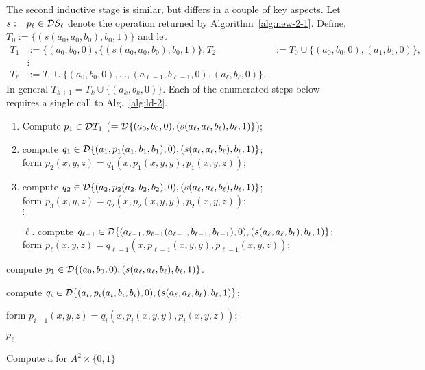   The second inductive stage is similar, but differs in a couple of key aspects.
Let $s := p_\ell \in \mathcal{D} S_\ell$ denote the operation returned by Algorithm~\ref{alg:new-2-1}.
Define, $T_0 := \{(s(a_{0}, a_{0}, b_{0}), b_{0}, 1)\}$ and let
\begin{align*}
  T_1 &:= \{(a_0, b_0, 0), \{(s(a_{0}, a_{0}, b_{0}), b_{0}, 1)\},
  T_2 &:=  T_0 \cup\{(a_0, b_0, 0), (a_1, b_1, 0)\},\\
  & \vdots\\
  T_\ell &:= T_0 \cup \{(a_0, b_0, 0), \dots,
(a_{\ell-1}, b_{\ell-1},0), (a_{\ell}, b_{\ell},0)\}.
\end{align*}
In general $T_{k+1} = T_{k} \cup \{(a_k, b_k, 0)\}$.
Each of the enumerated steps below requires a single call to Alg.~\ref{alg:ld-2}.
\begin{enumerate}[1.]
  \item Compute $p_1 \in \mathcal{D} T_1$ ($ = \mathcal{D} \{(a_0, b_0, 0), (s(a_{\ell}, a_{\ell}, b_{\ell}), b_{\ell}, 1)\}$);
  \item compute $q_1\in \mathcal{D} \{(a_1, p_1(a_1, b_1, b_1), 0), (s(a_{\ell}, a_{\ell}, b_{\ell}), b_{\ell}, 1)\}$; \\
  form $p_2(x,y,z) = q_1(x, p_1(x,y,y), p_1(x,y,z))$;
  \item compute $q_2\in \mathcal{D} \{(a_2, p_2(a_2, b_2, b_2), 0), (s(a_{\ell}, a_{\ell}, b_{\ell}), b_{\ell}, 1)\}$; \\
  form $p_3(x,y,z) = q_2(x, p_2(x,y,y), p_2(x,y,z))$;\\
  $\vdots$
  \item[$\ell$.] compute $q_{\ell-1}\in \mathcal{D} \{(a_{\ell-1}, p_{\ell-1}(a_{\ell-1}, b_{\ell-1}, b_{\ell-1}),0), (s(a_{\ell},a_{\ell}, b_{\ell}),  b_{\ell},1)\}$; \\
  form
  $p_{\ell}(x,y,z) = q_{\ell-1}(x, p_{\ell-1}(x,y,y), p_{\ell-1}(x,y,z))$;
\end{enumerate}



\begin{algorithm}

  compute $p_1 \in \mathcal{D} \{(a_0, b_0, 0), (s(a_{\ell}, a_{\ell}, b_{\ell}), b_{\ell}, 1)\}$. %

   {
    compute $q_i\in \mathcal{D} \{(a_i, p_i(a_i, b_i, b_i), 0), (s(a_{\ell}, a_{\ell}, b_{\ell}), b_{\ell}, 1)\}$;

    form $p_{i+1}(x,y,z) = q_i(x, p_i(x,y,y), p_i(x,y,z))$;
  }

  \Return $p_\ell$
  \caption{Compute a \ldto for $A^2 \times \{0,1\}$\label{alg:new-2-2}}
\end{algorithm}




